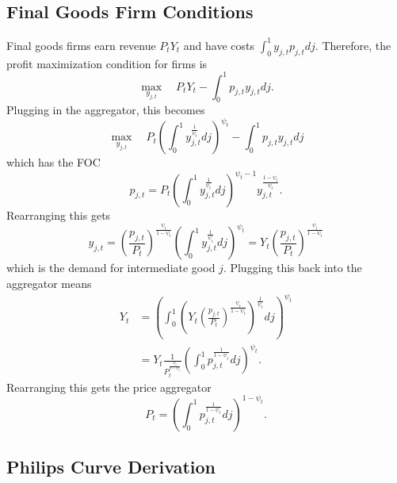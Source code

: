 \subsection{Final Goods Firm Conditions}

Final goods firms earn revenue $P_t Y_t$ and have costs $\int_0^1 y_{j, t} p_{j, t} dj$. Therefore, the profit maximization condition for firms is
\begin{equation*}
    \max_{y_{j, t}} \quad P_t Y_t - \int_0^1 p_{j, t} y_{j, t} dj.
\end{equation*}
Plugging in the aggregator, this becomes
\begin{equation*}
    \max_{y_{j, t}} \quad P_t \left( \int_0^1 y_{j, t}^\frac{1}{\psi_t} dj \right)^{\psi_t} - \int_0^1 p_{j, t} y_{j, t} dj
\end{equation*}
which has the FOC
\begin{equation*}
    p_{j, t} = P_t \left( \int_0^1 y_{j, t}^\frac{1}{\psi_t} dj \right)^{\psi_t - 1} y_{j, t}^\frac{1 - \psi_t}{\psi_t}.
\end{equation*}
Rearranging this gets
\begin{equation*}
    y_{j, t} = \left( \frac{p_{j, t}}{P_t} \right)^\frac{\psi_t}{1 - \psi_t} \left( \int_0^1 y_{j, t}^\frac{1}{\psi_t} dj \right)^{\psi_t} = Y_t \left( \frac{p_{j, t}}{P_t} \right)^\frac{\psi_t}{1 - \psi_t}   
\end{equation*}
which is the demand for intermediate good $j$. Plugging this back into the aggregator means
\begin{align*}
    Y_t &= \left( \int_0^1 \left(Y_t \left( \frac{p_{j, t}}{P_t} \right)^\frac{\psi_t}{1 - \psi_t}\right)^\frac{1}{\psi_t} dj \right)^{\psi_t} \\
    &= Y_t \frac{1}{P_t^\frac{\psi_t}{1 - \psi_t}} \left( \int_0^1 p_{j, t}^\frac{1}{1 - \psi_t} dj \right)^{\psi_t}.
\end{align*}
Rearranging this gets the price aggregator
\begin{equation*}
    P_t = \left(\int_0^1 p_{j, t}^\frac{1}{1 - \psi_t} dj \right)^{1 - \psi_t}.
\end{equation*}


\subsection{Philips Curve Derivation}

